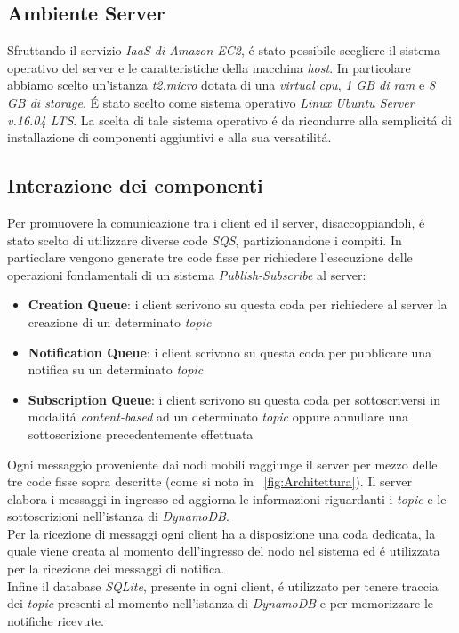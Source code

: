\documentclass{article}
\begin{document}
\subsection{Ambiente Server}
Sfruttando il servizio \textit{IaaS di Amazon EC2}, \'e stato possibile scegliere il sistema operativo del server e le caratteristiche della macchina \textit{host}. In particolare abbiamo scelto un'istanza \textit{t2.micro} dotata di una \textit{virtual cpu}, \textit{1 GB di ram} e \textit{8 GB di storage}. \'E stato scelto come sistema operativo \textit{Linux Ubuntu Server v.16.04 LTS}. La scelta di tale sistema operativo \'e da ricondurre alla semplicit\'a di installazione di componenti aggiuntivi e alla sua versatilit\'a.

\subsection{Interazione dei componenti}
Per promuovere la comunicazione tra i client ed il server, disaccoppiandoli, \'e stato scelto di utilizzare diverse code \textit{SQS}, partizionandone i compiti. In particolare vengono generate tre code fisse per richiedere l'esecuzione delle operazioni fondamentali di un sistema \textit{Publish-Subscribe} al  server:

\begin{itemize}
\item{\textbf{Creation Queue}: i client scrivono su questa coda per richiedere al server la creazione di un determinato \textit{topic}}
\item{\textbf{Notification Queue}: i client scrivono su questa coda per pubblicare una notifica su un determinato \textit{topic}}
\item{\textbf{Subscription Queue}: i client scrivono su questa coda per sottoscriversi in modalit\'a \textit{content-based} ad un determinato \textit{topic} oppure annullare una sottoscrizione precedentemente effettuata}
\end{itemize}

Ogni messaggio proveniente dai nodi mobili raggiunge il server per mezzo delle tre code fisse sopra descritte (come si nota in \figurename{~\ref{fig:Architettura}}). Il server elabora i messaggi in ingresso ed aggiorna le informazioni riguardanti i \textit{topic} e le sottoscrizioni nell'istanza di \textit{DynamoDB}.
\\
Per la ricezione di messaggi ogni client ha a disposizione una coda dedicata, la quale viene creata al momento dell'ingresso del nodo nel sistema ed \'e utilizzata per la ricezione dei messaggi di notifica.
\\
Infine il database \textit{SQLite}, presente in ogni client, \'e utilizzato per tenere traccia dei \textit{topic} presenti al momento nell'istanza di \textit{DynamoDB} e per memorizzare le notifiche ricevute.
\end{document}
